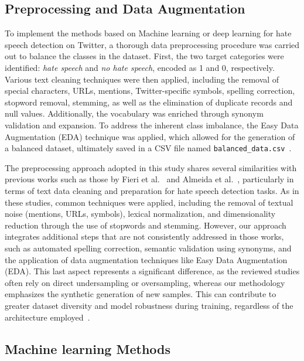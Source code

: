 \subsection{Preprocessing and Data Augmentation}

To implement the methods based on Machine learning or deep learning for hate speech detection on Twitter, a thorough data preprocessing procedure was carried out to balance the classes in the dataset. First, the two target categories were identified: \textit{hate speech} and \textit{no hate speech}, encoded as 1 and 0, respectively. Various text cleaning techniques were then applied, including the removal of special characters, URLs, mentions, Twitter-specific symbols, spelling correction, stopword removal, stemming, as well as the elimination of duplicate records and null values. Additionally, the vocabulary was enriched through synonym validation and expansion. To address the inherent class imbalance, the Easy Data Augmentation (EDA) technique was applied, which allowed for the generation of a balanced dataset, ultimately saved in a CSV file named \texttt{balanced\_data.csv}~\cite{wei2019eda}.

The preprocessing approach adopted in this study shares several similarities with previous works such as those by Fieri et al.~\cite{fieri2023offensive} and Almeida et al.~\cite{almeida2023comparison}, particularly in terms of text data cleaning and preparation for hate speech detection tasks. As in these studies, common techniques were applied, including the removal of textual noise (mentions, URLs, symbols), lexical normalization, and dimensionality reduction through the use of stopwords and stemming. However, our approach integrates additional steps that are not consistently addressed in those works, such as automated spelling correction, semantic validation using synonyms, and the application of data augmentation techniques like Easy Data Augmentation (EDA). This last aspect represents a significant difference, as the reviewed studies often rely on direct undersampling or oversampling, whereas our methodology emphasizes the synthetic generation of new samples. This can contribute to greater dataset diversity and model robustness during training, regardless of the architecture employed~\cite{wei2019eda}.


\subsection{Machine learning Methods}


